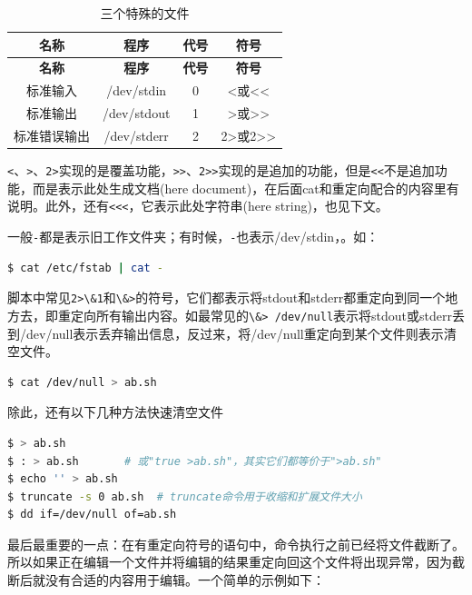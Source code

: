 \documentclass[doctor,openright,twoside]{sjtuthesis}
\newcommand{\passthrough}[1]{#1}
\theoremstyle{plain}
\theoremstyle{definition}
\theoremstyle{remark}
\theoremstyle{ocrenumbox}
\theoremstyle{plain}
\begin{document}
\begin{longtable}[]{@{}cccc@{}}
\caption{三个特殊的文件}\tabularnewline
\toprule
\textbf{名称} & \textbf{程序} & \textbf{代号} & \textbf{符号}\tabularnewline
\midrule
\endfirsthead
\toprule
\textbf{名称} & \textbf{程序} & \textbf{代号} & \textbf{符号}\tabularnewline
\midrule
\endhead
标准输入 & /dev/stdin & 0 & \textless 或\textless\textless{}\tabularnewline
标准输出 & /dev/stdout & 1 & \textgreater 或\textgreater\textgreater{}\tabularnewline
标准错误输出 & /dev/stderr & 2 & 2\textgreater 或2\textgreater\textgreater{}\tabularnewline
\bottomrule
\end{longtable}

\passthrough{\lstinline!<!}、\passthrough{\lstinline!>!}、\passthrough{\lstinline!2>!}实现的是覆盖功能，\passthrough{\lstinline!>>!}、\passthrough{\lstinline!2>>!}实现的是追加的功能，但是\passthrough{\lstinline!<<!}不是追加功能，而是表示此处生成文档(here document)，在后面cat和重定向配合的内容里有说明。此外，还有\passthrough{\lstinline!<<<!}，它表示此处字符串(here string)，也见下文。

一般\passthrough{\lstinline!-!}都是表示旧工作文件夹；有时候，\passthrough{\lstinline!-!}也表示/dev/stdin，。如：

\begin{lstlisting}[language=bash]
$ cat /etc/fstab | cat -
\end{lstlisting}

脚本中常见\passthrough{\lstinline!2>\&1!}和\passthrough{\lstinline!\&>!}的符号，它们都表示将stdout和stderr都重定向到同一个地方去，即重定向所有输出内容。如最常见的\passthrough{\lstinline!\&> /dev/null!}表示将stdout或stderr丢到/dev/null表示丢弃输出信息，反过来，将/dev/null重定向到某个文件则表示清空文件。

\begin{lstlisting}[language=bash]
$ cat /dev/null > ab.sh
\end{lstlisting}

除此，还有以下几种方法快速清空文件

\begin{lstlisting}[language=bash]
$ > ab.sh
$ : > ab.sh       # 或"true >ab.sh"，其实它们都等价于">ab.sh"
$ echo '' > ab.sh
$ truncate -s 0 ab.sh  # truncate命令用于收缩和扩展文件大小
$ dd if=/dev/null of=ab.sh
\end{lstlisting}

最后最重要的一点：在有重定向符号的语句中，命令执行之前已经将文件截断了。所以如果正在编辑一个文件并将编辑的结果重定向回这个文件将出现异常，因为截断后就没有合适的内容用于编辑。一个简单的示例如下：
\end{document}

